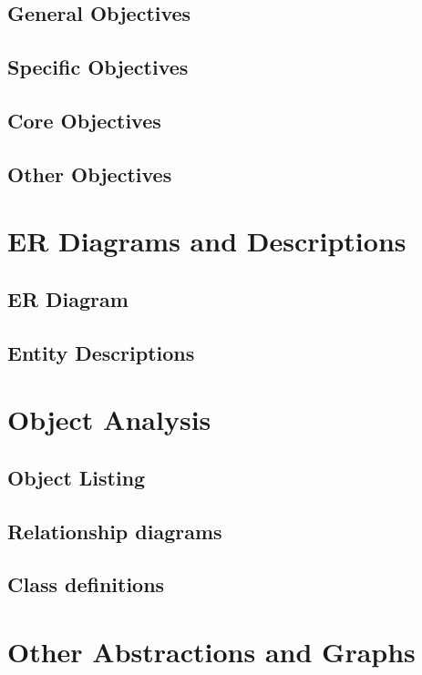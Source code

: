 \subsection{General Objectives}

\subsection{Specific Objectives}

\subsection{Core Objectives}

\subsection{Other Objectives}

\section{ER Diagrams and Descriptions}

\subsection{ER Diagram}

\subsection{Entity Descriptions}

\section{Object Analysis}

\subsection{Object Listing}

\subsection{Relationship diagrams}

\subsection{Class definitions}

\section{Other Abstractions and Graphs}

